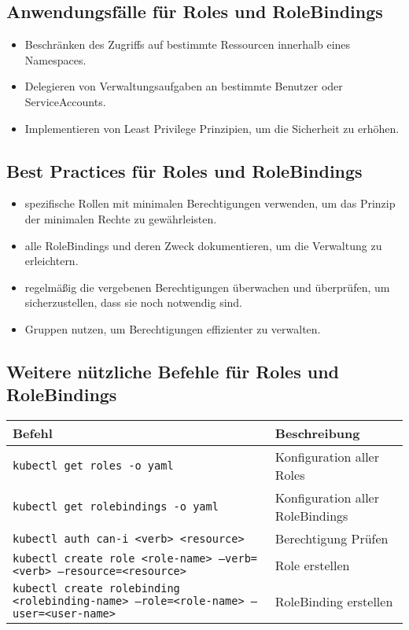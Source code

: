 \newpage
\subsection{Anwendungsfälle für Roles und RoleBindings}
\begin{itemize}
    \item Beschränken des Zugriffs auf bestimmte Ressourcen innerhalb eines Namespaces.
    \item Delegieren von Verwaltungsaufgaben an bestimmte Benutzer oder ServiceAccounts.
    \item Implementieren von Least Privilege Prinzipien, um die Sicherheit zu erhöhen.
\end{itemize}

\subsection{Best Practices für Roles und RoleBindings}
\begin{itemize}
    \item spezifische Rollen mit minimalen Berechtigungen verwenden, um das Prinzip der minimalen Rechte zu gewährleisten.
    \item alle RoleBindings und deren Zweck dokumentieren, um die Verwaltung zu erleichtern.
    \item regelmäßig die vergebenen Berechtigungen überwachen und überprüfen, um sicherzustellen, dass sie noch notwendig sind.
    \item Gruppen nutzen, um Berechtigungen effizienter zu verwalten.
\end{itemize}

\subsection{Weitere nützliche Befehle für Roles und RoleBindings}
\begin{tabular}{|p{}|p{}|}
\hline
\textbf{Befehl} & \textbf{Beschreibung} \\
\hline
\texttt{kubectl get roles -o yaml} & Konfiguration aller Roles \\
\texttt{kubectl get rolebindings -o yaml} & Konfiguration aller RoleBindings \\
\texttt{kubectl auth can-i <verb> <resource>} & Berechtigung Prüfen \\
\texttt{kubectl create role <role-name> --verb=<verb> --resource=<resource>} & Role erstellen \\
\texttt{kubectl create rolebinding <rolebinding-name> --role=<role-name> --user=<user-name>} & RoleBinding erstellen \\
\hline
\end{tabular}

